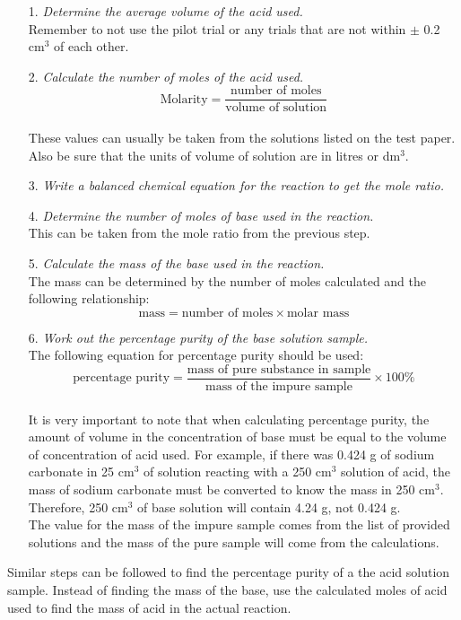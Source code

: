 \begin{enumerate}
\item[1.] \textit{Determine the average volume of the acid used.}\\
Remember to not use the pilot trial or any trials that are not within $\pm$ 0.2 cm$^3$ of each other.
\item[2.] \textit{Calculate the number of moles of the acid used.}\\
$$\text{Molarity} = \frac{\text{number of moles}}{\text{volume of solution}}$$\\
These values can usually be taken from the solutions listed on the test paper. Also be sure that the units of volume of solution are in litres or dm$^3$.
\item[3.] \textit{Write a balanced chemical equation for the reaction to get the mole ratio.}
\item[4.] \textit{Determine the number of moles of base used in the reaction.}\\
This can be taken from the mole ratio from the previous step.
\item[5.] \textit{Calculate the mass of the base used in the reaction.}\\
The mass can be determined by the number of moles calculated and the following relationship:\\
$$\text{mass} = \text{number of moles} \times \text{molar mass}$$
\item[6.] \textit{Work out the percentage purity of the base solution sample.}\\
The following equation for percentage purity should be used:\\
$$\text{percentage purity} = \frac{\text{mass of pure substance in sample}}{\text{mass of the impure sample}} \times 100\%$$\\
It is very important to note that when calculating percentage purity, the amount of volume in the concentration of base must be equal to the volume of concentration of acid used. For example, if there was 0.424 g of sodium carbonate in 25 cm$^3$ of solution reacting with a 250 cm$^3$ solution of acid, the mass of sodium carbonate must be converted to know the mass in 250 cm$^3$.  Therefore, 250 cm$^3$ of base solution will contain 4.24 g, not 0.424 g.\\
The value for the mass of the impure sample comes from the list of provided solutions and the mass of the pure sample will come from the calculations.
\end{enumerate}
Similar steps can be followed to find the percentage purity of a the acid solution sample. Instead of finding the mass of the base, use the calculated moles of acid used to find the mass of acid in the actual reaction.


